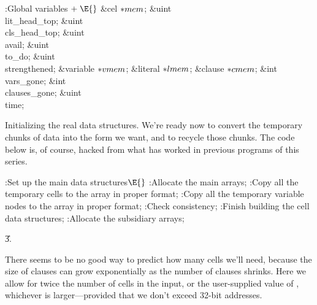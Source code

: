 \B{}:Global variables\X${}\mathrel+\E{}$\6
\&{cel} ${}{*}\\{mem}{}$;\6
\&{uint} \\{lit\_head\_top};\6
\&{uint} \\{cls\_head\_top};\6
\&{uint} \\{avail};\6
\&{uint} \\{to\_do};\6
\&{uint} \\{strengthened};\6
\&{variable} ${}{*}\\{vmem}{}$;\6
\&{literal} ${}{*}\\{lmem}{}$;\6
\&{clause} ${}{*}\\{cmem}{}$;\6
\&{int} \\{vars\_gone};\6
\&{int} \\{clauses\_gone};\6
\&{uint} \\{time};%
\par
\fi

Initializing the real data structures.
We're ready now to convert the temporary chunks of data into the
form we want, and to recycle those chunks. The code below is, of course,
hacked from what has worked in previous programs of this series.

\Y\B\4:Set up the main data structures\X${}\E{}$\6
:Allocate the main arrays\X;\6
:Copy all the temporary cells to the  array in proper format\X;%
\6
:Copy all the temporary variable nodes to the  array in proper
format\X;\6
:Check consistency\X;\6
:Finish building the cell data structures\X;\6
:Allocate the subsidiary arrays\X;\par
\U3.\fi

There seems to be no good way to predict how many cells
we'll need, because
the size of clauses can grow exponentially as the number of clauses shrinks.
Here we allow for twice the number of cells in the input, or the
user-supplied value of , whichever is larger---provided that
we don't exceed 32-bit addresses.

